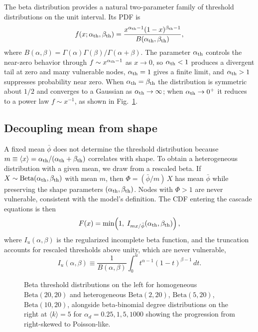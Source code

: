 \documentclass[]{revtex4-2}
\begin{document}
The beta distribution provides a natural two-parameter family of threshold distributions on the unit interval. Its PDF is
\begin{equation}
    f(x; \alpha_{\rm th}, \beta_{\rm th}) = \frac{x^{\alpha_{\rm th}-1}(1-x)^{\beta_{\rm th}-1}}{B(\alpha_{\rm th}, \beta_{\rm th})},
\end{equation}
where $B(\alpha,\beta)=\Gamma(\alpha)\Gamma(\beta)/\Gamma(\alpha+\beta)$. The parameter $\alpha_{\rm th}$ controls the near-zero behavior through $f \sim x^{\alpha_{\rm th}-1}$ as $x\to0$, so $\alpha_{\rm th}<1$ produces a divergent tail at zero and many vulnerable nodes, $\alpha_{\rm th}=1$ gives a finite limit, and $\alpha_{\rm th}>1$ suppresses probability near zero. When $\alpha_{\rm th}=\beta_{\rm th}$ the distribution is symmetric about $1/2$ and converges to a Gaussian as $\alpha_{\rm th}\to\infty$; when $\alpha_{\rm th}\to0^+$ it reduces to a power law $f\sim x^{-1}$, as shown in Fig.~\ref{fig:beta-dist}.

\subsection{Decoupling mean from shape}

A fixed mean $\bar\phi$ does not determine the threshold distribution because $m \equiv \langle x\rangle = \alpha_{\rm th}/(\alpha_{\rm th}+\beta_{\rm th})$ correlates with shape. To obtain a heterogeneous distribution with a given mean, we draw from a rescaled beta. If $X \sim \text{Beta}(\alpha_{\rm th},\beta_{\rm th})$ with mean $m$, then $\Phi = (\bar\phi/m)\,X$ has mean $\bar\phi$ while preserving the shape parameters $(\alpha_{\rm th},\beta_{\rm th})$. Nodes with $\Phi>1$ are never vulnerable, consistent with the model's definition. The CDF entering the cascade equations is then
\begin{equation}
    F(x) = \min\!\left(1,\; I_{m x/\bar\phi}(\alpha_{\rm th},\beta_{\rm th})\right),
\end{equation}
where $I_u(\alpha,\beta)$ is the regularized incomplete beta function, and the truncation accounts for rescaled thresholds above unity, which are never vulnerable,
\begin{equation}
    I_u(\alpha,\beta) \equiv \frac{1}{B(\alpha,\beta)}\int_0^u t^{\alpha-1}(1-t)^{\beta-1}\,dt .
\end{equation}

\begin{figure}[t]
\centering
{}
\caption{Beta threshold distributions on the left for homogeneous $\mathrm{Beta}(20,20)$ and heterogeneous $\mathrm{Beta}(2,20)$, $\mathrm{Beta}(5,20)$, $\mathrm{Beta}(10,20)$, alongside beta-binomial degree distributions on the right at $\langle k\rangle=5$ for $\alpha_d=0.25,1,5,1000$ showing the progression from right-skewed to Poisson-like.}
\label{fig:beta-dist}
\end{figure}
\end{document}
